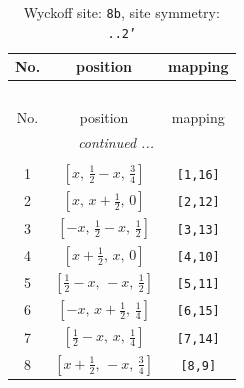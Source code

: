 \documentclass[fleqn,8pt]{jsarticle}
\begin{document}
\begin{longtable}{ccc}
\caption{Wyckoff site: {\tt 8b}, site symmetry: {\tt ..2'}}
 \\
 \hline \hline
No. & position & mapping \\ \hline \endfirsthead

\multicolumn{2}{l}{\tablename\ \thetable{}} \\
 \hline \hline
No. & position & mapping \\ \hline \endhead

 \hline \hline
\multicolumn{2}{r}{\footnotesize\it continued ...} \\ \endfoot

 \hline \hline
\multicolumn{2}{r}{} \\ \endlastfoot

1 & $\left[ x,\, \frac{1}{2} - x,\, \frac{3}{4} \right]$ & {\tt [1,16]} \\ \hline
2 & $\left[ x,\, x + \frac{1}{2},\, 0 \right]$ & {\tt [2,12]} \\ \hline
3 & $\left[ - x,\, \frac{1}{2} - x,\, \frac{1}{2} \right]$ & {\tt [3,13]} \\ \hline
4 & $\left[ x + \frac{1}{2},\, x,\, 0 \right]$ & {\tt [4,10]} \\ \hline
5 & $\left[ \frac{1}{2} - x,\, - x,\, \frac{1}{2} \right]$ & {\tt [5,11]} \\ \hline
6 & $\left[ - x,\, x + \frac{1}{2},\, \frac{1}{4} \right]$ & {\tt [6,15]} \\ \hline
7 & $\left[ \frac{1}{2} - x,\, x,\, \frac{1}{4} \right]$ & {\tt [7,14]} \\ \hline
8 & $\left[ x + \frac{1}{2},\, - x,\, \frac{3}{4} \right]$ & {\tt [8,9]} \\
\end{longtable}
\renewcommand{\arraystretch}{1.2}
\end{document}
